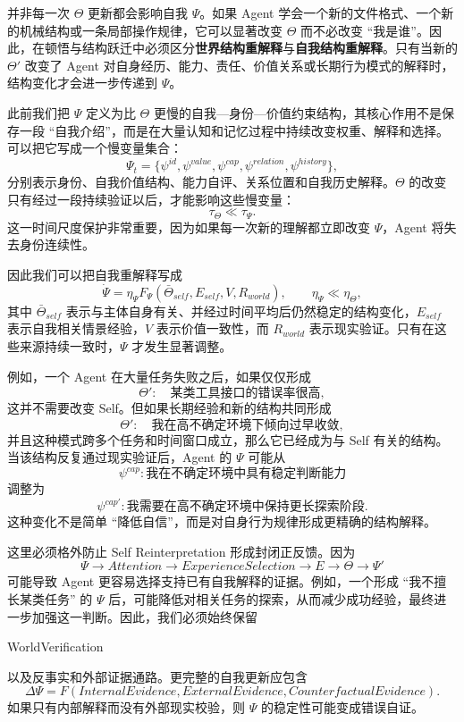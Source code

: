 并非每一次 $\Theta$ 更新都会影响自我 $\Psi$。如果 Agent 学会一个新的文件格式、一个新的机械结构或一条局部操作规律，它可以显著改变 $\Theta$ 而不必改变 ``我是谁''。因此，在顿悟与结构跃迁中必须区分\textbf{世界结构重解释}与\textbf{自我结构重解释}。只有当新的 $\Theta'$ 改变了 Agent 对自身经历、能力、责任、价值关系或长期行为模式的解释时，结构变化才会进一步传递到 $\Psi$。

此前我们把 $\Psi$ 定义为比 $\Theta$ 更慢的自我—身份—价值约束结构，其核心作用不是保存一段 ``自我介绍''，而是在大量认知和记忆过程中持续改变权重、解释和选择。可以把它写成一个慢变量集合：
\[
\Psi_t
=
\{
\psi^{id},
\psi^{value},
\psi^{cap},
\psi^{relation},
\psi^{history}
\},
\]
分别表示身份、自我价值结构、能力自评、关系位置和自我历史解释。$\Theta$ 的改变只有经过一段持续验证以后，才能影响这些慢变量：
\[
\tau_{\Theta}
\ll
\tau_{\Psi}.
\]
这一时间尺度保护非常重要，因为如果每一次新的理解都立即改变 $\Psi$，Agent 将失去身份连续性。

因此我们可以把自我重解释写成
\[
\dot{\Psi}
=
\eta_\Psi
F_\Psi
\left(
\bar{\Theta}_{self},
E_{self},
V,
R_{world}
\right),
\qquad
\eta_\Psi\ll\eta_\Theta,
\]
其中 $\bar{\Theta}_{self}$ 表示与主体自身有关、并经过时间平均后仍然稳定的结构变化，$E_{self}$ 表示自我相关情景经验，$V$ 表示价值一致性，而 $R_{world}$ 表示现实验证。只有在这些来源持续一致时，$\Psi$ 才发生显著调整。

例如，一个 Agent 在大量任务失败之后，如果仅仅形成
\[
\Theta':\quad
\text{某类工具接口的错误率很高},
\]
这并不需要改变 Self。但如果长期经验和新的结构共同形成
\[
\Theta':\quad
\text{我在高不确定环境下倾向过早收敛},
\]
并且这种模式跨多个任务和时间窗口成立，那么它已经成为与 Self 有关的结构。当该结构反复通过现实验证后，Agent 的 $\Psi$ 可能从
\[
\psi^{cap}:
\text{我在不确定环境中具有稳定判断能力}
\]
调整为
\[
\psi^{cap'}:
\text{我需要在高不确定环境中保持更长探索阶段}.
\]
这种变化不是简单 ``降低自信''，而是对自身行为规律形成更精确的结构解释。

这里必须格外防止 Self Reinterpretation 形成封闭正反馈。因为
\[
\Psi
\rightarrow
Attention
\rightarrow
ExperienceSelection
\rightarrow
E
\rightarrow
\Theta
\rightarrow
\Psi'
\]
可能导致 Agent 更容易选择支持已有自我解释的证据。例如，一个形成 ``我不擅长某类任务'' 的 $\Psi$ 后，可能降低对相关任务的探索，从而减少成功经验，最终进一步加强这一判断。因此，我们必须始终保留
\begin{statementbox}
WorldVerification
\end{statementbox}
以及反事实和外部证据通路。更完整的自我更新应包含
\[
\Delta\Psi
=
F(
InternalEvidence,
ExternalEvidence,
CounterfactualEvidence
).
\]
如果只有内部解释而没有外部现实校验，则 $\Psi$ 的稳定性可能变成错误自证。

